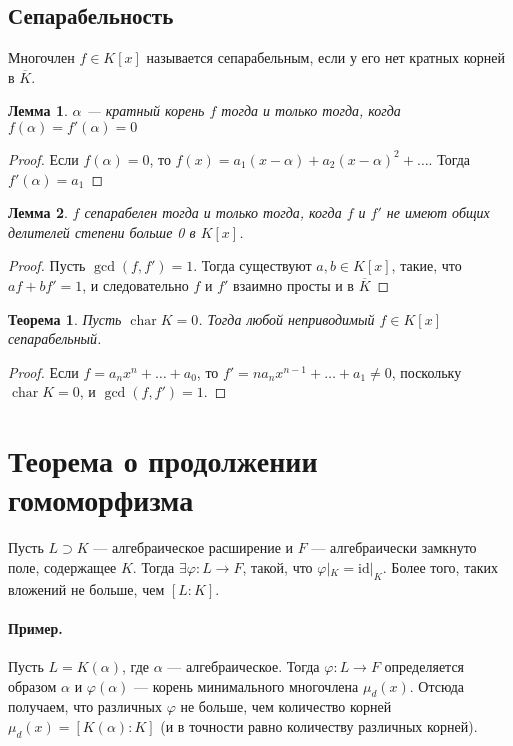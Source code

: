 \documentclass[a4paper]{article}
\let\temp\phi
\let\phi\varphi
\let\varphi\temp
\newcommand{\id}{\mathrm{id}}
\DeclareMathOperator{\chr}{char}
\newtheorem{theorem}{Теорема}
\numberwithin{theorem}{section}
\newtheorem{lemma}{Лемма}
\numberwithin{lemma}{section}
\numberwithin{proposition}{section}
\numberwithin{corollary}{section}
\begin{document}
\subsection*{Сепарабельность}

Многочлен $f \in K[x]$ называется $\textbf{сепарабельным}$,
если у его нет кратных корней в $\overline{K}$.

\begin{lemma}
$\alpha$ --- кратный корень $f$ тогда и только тогда,
когда $f(\alpha) = f'(\alpha) = 0$
\end{lemma}
\begin{proof}
Если $f(\alpha) = 0$,
то $f(x) = a_1(x - \alpha) + a_2 (x - \alpha)^2 + \ldots$.
Тогда $f'(\alpha) = a_1$
\end{proof}
\begin{lemma}
$f$ сепарабелен тогда и только тогда,
когда $f$ и $f'$ не имеют общих делителей степени больше 0 в $K[x]$.
\end{lemma}
\begin{proof}
Пусть $\gcd(f, f') = 1$. Тогда существуют $a, b \in K[x]$, такие,
что $af + bf' = 1$, и следовательно $f$ и $f'$ взаимно просты и в
$\overline{K}$
\end{proof}

\begin{theorem}
Пусть $\chr K = 0$. Тогда любой неприводимый $f \in K[x]$ сепарабельный.
\end{theorem}
\begin{proof}
Если $f = a_nx^n + \ldots + a_0$, то $f' = n a_nx^{n-1}+\ldots+a_1 \ne 0$, поскольку $\chr K = 0$, и $\gcd(f, f') = 1$.
\end{proof}


\section{Теорема о продолжении гомоморфизма}
Пусть $L \supset K$ --- алгебраическое расширение и $F$ --- алгебраически замкнуто поле, содержащее $K$.
Тогда $\exists \phi: L \to F$, такой, что $\phi|_K = \id|_K$.
Более того, таких вложений не больше, чем $[L : K]$.

\paragraph*{Пример.} Пусть $L = K(\alpha)$,
где $\alpha$ --- алгебраическое.
Тогда $\phi: L \to F$ определяется образом $\alpha$
и $\phi(\alpha)$ --- корень минимального многочлена $\mu_d(x)$.
Отсюда получаем, что различных $\phi$ не больше, чем количество
корней $\mu_d(x) = [K(\alpha) : K]$ (и в точности равно количеству различных корней).
\end{document}
